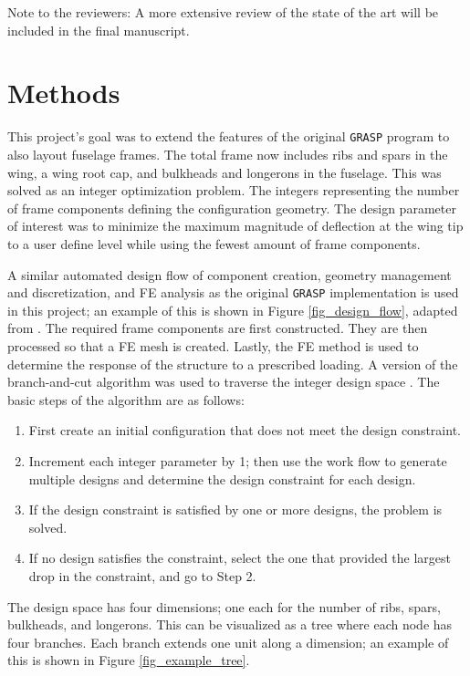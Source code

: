 \documentclass[conf]{new-aiaa}
\begin{document}
Note to the reviewers: A more extensive review of the 
state of the art will be included in the 
final manuscript.

\section{Methods} \label{sec_methods}
This project's goal was to extend the features of the original \texttt{GRASP}
program to also layout fuselage frames.
The total frame now includes ribs and spars in the wing, a wing root cap,
and bulkheads and longerons in the fuselage.
This was solved as an integer optimization problem.
The integers representing the number of frame components 
defining the configuration geometry.
The design parameter of interest was to minimize the 
maximum magnitude of deflection at the wing tip to a user define level
while using the fewest amount of frame components.

A similar automated design flow of component creation, geometry management and discretization,
and FE analysis as the original \texttt{GRASP} implementation
is used in this project;
an example of this is shown in Figure \ref{fig_design_flow},
adapted from 
\cite{clough_automated_wing_internal_structure_placement_guided_by_FEA}.
The required frame components are first constructed.
They are then processed so that a FE mesh is created.
Lastly, the FE method is used to determine the response 
of the structure to a prescribed loading.
A version of the branch-and-cut algorithm 
was used to traverse the integer design space
\cite{padberg_branch_and_cut_algorithm_for_resolution_of_sym_traveling_salesman}.
The basic steps of the algorithm are as follows:
\begin{enumerate}
  \item First create an initial configuration that does not meet the design constraint. 
  \item Increment each integer parameter by 1;
          then use the work flow to generate multiple designs and determine 
          the design constraint for each design.
  \item If the design constraint is satisfied by one or more designs, the problem is solved. 
  \item If no design satisfies the constraint, select the one that provided the largest 
          drop in the constraint, and go to Step 2. 
\end{enumerate}

\noindent
The design space has four dimensions; 
one each for the number of ribs, spars, bulkheads, and longerons.
This can be visualized as a tree where each node has
four branches. 
Each branch extends one unit along a dimension;
an example of this is shown in Figure \ref{fig_example_tree}.
\end{document}
